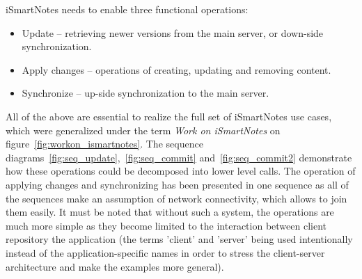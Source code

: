 iSmartNotes needs to enable three functional operations: 
\begin{itemize}
\item{Update -- retrieving newer versions from the main server, or down-side synchronization.}
\item{Apply changes -- operations of creating, updating and removing content.}
\item{Synchronize -- up-side synchronization to the main server.}
\end{itemize}
All of the above are essential to realize the full set of iSmartNotes use cases, which were generalized under the term \textit{Work on iSmartNotes} on figure~\ref{fig:workon_ismartnotes}. The sequence diagrams~\ref{fig:seq_update},~\ref{fig:seq_commit} and~\ref{fig:seq_commit2}  demonstrate how these operations could be decomposed into lower level calls. The operation of applying changes and synchronizing has been presented in one sequence as all of the sequences make an assumption of network connectivity, which allows to join them easily. It must be noted that without such a system, the operations are much more simple as they become limited to the interaction between client repository the application (the terms 'client' and 'server' being used intentionally instead of the application-specific names in order to stress the client-server architecture and make the examples more general).

